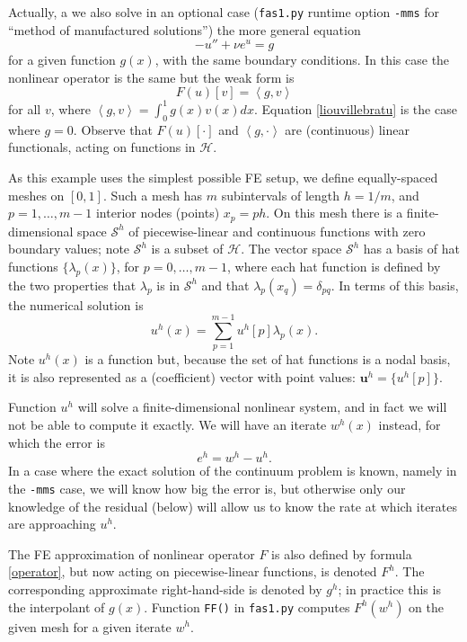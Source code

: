 \documentclass[letterpaper,final,12pt,reqno]{amsart}
\newcommand{\bu}{\mathbf{u}}
\newcommand{\ip}[2]{\left<#1,#2\right>}
\begin{document}
Actually, a we also solve in an optional case (\texttt{fas1.py} runtime option \texttt{-mms} for ``method of manufactured solutions'') the more general equation
  $$-u'' + \nu e^u = g$$
for a given function $g(x)$, with the same boundary conditions.  In this case the nonlinear operator is the same but the weak form is
\begin{equation}
  F(u)[v] = \ip{g}{v} \label{weakform}
\end{equation}
for all $v$, where $\ip{g}{v} = \int_0^1 g(x) v(x) dx$.  Equation \eqref{liouvillebratu} is the case where $g=0$.  Observe that $F(u)[\cdot]$ and $\ip{g}{\cdot}$ are (continuous) linear functionals, acting on functions in $\mathcal{H}$.

As this example uses the simplest possible FE setup, we define equally-spaced meshes on $[0,1]$.  Such a mesh has $m$ subintervals of length $h=1/m$, and $p=1,\dots,m-1$ interior nodes (points) $x_p=ph$.  On this mesh there is a finite-dimensional space $\mathcal{S}^h$ of piecewise-linear and continuous functions with zero boundary values; note $\mathcal{S}^h$ is a subset of $\mathcal{H}$.  The vector space $\mathcal{S}^h$ has a basis of hat functions $\{\lambda_p(x)\}$, for $p=0,\dots,m-1$, where each hat function is defined by the two properties that $\lambda_p$ is in $\mathcal{S}^h$ and that $\lambda_p(x_q)=\delta_{pq}$.  In terms of this basis, the numerical solution is
\begin{equation}
  u^h(x) = \sum_{p=1}^{m-1} u^h[p] \lambda_p(x).  \label{fesolution}
\end{equation}
Note $u^h(x)$ is a function but, because the set of hat functions is a nodal basis, it is also represented as a (coefficient) vector with point values: $\bu^h =\{u^h[p]\}$.

Function $u^h$ will solve a finite-dimensional nonlinear system, and in fact we will not be able to compute it exactly.  We will have an iterate $w^h(x)$ instead, for which the error is
\begin{equation}
  e^h = w^h - u^h.  \label{error}
\end{equation}
In a case where the exact solution of the continuum problem is known, namely in the \texttt{-mms} case, we will know how big the error is, but otherwise only our knowledge of the residual (below) will allow us to know the rate at which iterates are approaching $u^h$.

The FE approximation of nonlinear operator $F$ is also defined by formula \eqref{operator}, but now acting on piecewise-linear functions, is denoted $F^h$.  The corresponding approximate right-hand-side is denoted by $g^h$; in practice this is the interpolant of $g(x)$.  Function \texttt{FF()} in \texttt{fas1.py} computes $F^h(w^h)$ on the given mesh for a given iterate $w^h$.
\end{document}
